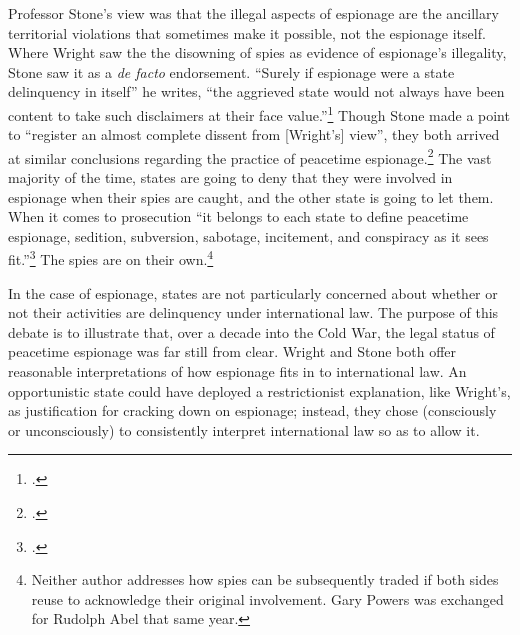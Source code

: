\documentclass{memoir}
\begin{document}
\begin{refsegment}

Professor Stone's view was that the illegal aspects of espionage are the ancillary territorial violations that sometimes make it possible, not the espionage itself. Where Wright saw the the disowning of spies as evidence of espionage's illegality, Stone saw it as a \emph{de facto} endorsement. ``Surely if espionage were a state delinquency in itself'' he writes, ``the aggrieved state would not always have been content to take such disclaimers at their face value.''\footcite[p.~33]{stone_legal_1962} Though Stone made a point to ``register an almost complete dissent from [Wright's] view'', they both arrived at similar conclusions regarding the practice of peacetime espionage.\footcite[p.~33]{stone_legal_1962} The vast majority of the time, states are going to deny that they were involved in espionage when their spies are caught, and the other state is going to let them. When it comes to prosecution ``it belongs to each state to define peacetime espionage, sedition, subversion, sabotage, incitement, and conspiracy as it sees fit.''\footcite[p.~4]{wright_espionage_1962} The spies are on their own.\footnote{Neither author addresses how spies can be subsequently traded if both sides reuse to acknowledge their original involvement. Gary Powers was exchanged for Rudolph Abel that same year.}


In the case of espionage, states are not particularly concerned about whether or not their activities are delinquency under international law. The purpose of this debate is to illustrate that, over a decade into the Cold War, the legal status of peacetime espionage was far still from clear. Wright and Stone both offer reasonable interpretations of how espionage fits in to international law. An opportunistic state could have deployed a restrictionist explanation, like Wright's, as justification for cracking down on espionage; instead, they chose (consciously or unconsciously) to consistently interpret international law so as to allow it.


\end{refsegment}
\end{document}
